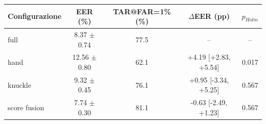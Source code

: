 \begin{tabular}{lcccc}
\toprule
Configurazione & EER (\%) & TAR@FAR=1\% (\%) & $\Delta$EER (pp) & $p_{Holm}$ \\
\midrule
full & 8.37 $\pm$ 0.74 & 77.5 & -- & -- \\
hand & 12.56 $\pm$ 0.80 & 62.1 & +4.19 [+2.83, +5.54] & 0.017 \\
knuckle & 9.32 $\pm$ 0.45 & 76.1 & +0.95 [-3.34, +5.25] & 0.567 \\
score fusion & 7.74 $\pm$ 0.30 & 81.1 & -0.63 [-2.49, +1.23] & 0.567 \\
\bottomrule
\end{tabular}